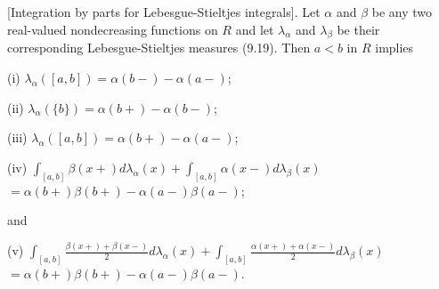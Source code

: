 [Integration by parts for Lebesgue-Stieltjes integrals]. Let $\alpha$ and $\beta$ be any two real-valued nondecreasing functions on $R$ and let $\lambda_{\alpha}$ and $\lambda_{\beta}$ be their corresponding Lebesgue-Stieltjes measures (9.19). Then $a < b$ in $R$ implies

(i) $\lambda_{\alpha}([a, b]) = \alpha(b-) - \alpha(a-)$;

(ii) $\lambda_{\alpha}(\{b\}) = \alpha(b+) - \alpha(b-)$;

(iii) $\lambda_{\alpha}([a, b]) = \alpha(b+) - \alpha(a-)$;

(iv) $\int_{[a,b]} \beta(x+) d\lambda_{\alpha}(x) + \int_{[a,b]} \alpha(x-) d\lambda_{\beta}(x)$
$= \alpha(b+) \beta(b+) - \alpha(a-) \beta(a-)$;

and

(v) $\int_{[a,b]} \frac{\beta(x+) + \beta(x-)}{2} d\lambda_{\alpha}(x) + \int_{[a,b]} \frac{\alpha(x+) + \alpha(x-)}{2} d\lambda_{\beta}(x)$
$= \alpha(b+) \beta(b+) - \alpha(a-) \beta(a-)$.